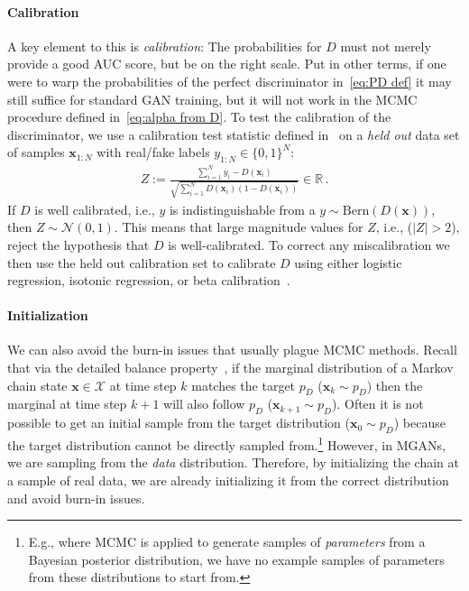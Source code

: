\documentclass{article}
\renewcommand{\vec}[1]{{\boldsymbol{\mathbf{#1}}}} %
\newcommand{\R}{\mathbb{R}}
\newcommand{\set}[1]{\mathcal{#1}}
\newcommand{\sample}{\sim}
\newcommand{\norm}{\mathcal{N}}
\newcommand{\bern}{\textrm{Bern}}
\newcommand{\PD}{{p_D}}
\newcommand{\setx}{\set{X}}
\begin{document}
\paragraph{Calibration}
A key element to this is \emph{calibration}: The probabilities for $D$ must not merely provide a good AUC score, but be on the right scale.
Put in other terms, if one were to warp the probabilities of the perfect discriminator in~\eqref{eq:PD def} it may still suffice for standard GAN training, but it will not work in the MCMC procedure defined in~\eqref{eq:alpha from D}.
To test the calibration of the discriminator, we use a calibration test statistic defined in~\citet{Dawid1997} on a \emph{held out} data set of samples $\vec x_{1:N}$ with real/fake labels $y_{1:N} \in \{0,1\}^N$:
\begin{align}
  Z := \frac{\sum_{i=1}^N y_i - D(\vec x_i)}{\sqrt{\sum_{i=1}^N D(\vec x_i) (1 - D(\vec x_i))}} \in \R\,. \label{eq:calib score}
\end{align}
If $D$ is well calibrated, i.e., $y$ is indistinguishable from a $y \sample \bern(D(\vec x))$, then $Z \sample \norm(0,1)$.
This means that large magnitude values for $Z$, i.e., ($|Z| > 2$), reject the hypothesis that $D$ is well-calibrated.
To correct any miscalibration we then use the held out calibration set to calibrate $D$ using either logistic regression, isotonic regression, or beta calibration~\citep{Kull2017}.

\paragraph{Initialization}
We can also avoid the burn-in issues that usually plague MCMC methods.
Recall that via the detailed balance property~\citep[Ch.~1]{Gilks1996}, if the marginal distribution of a Markov chain state $\vec x \in \setx$ at time step $k$ matches the target $\PD$ ($\vec x_k \sample \PD$) then the marginal at time step $k+1$ will also follow $\PD$ ($\vec x_{k+1} \sample \PD$)\@.
Often it is not possible to get an initial sample from the target distribution ($\vec x_0 \sample \PD$) because
the target distribution cannot be directly sampled from.\footnote{E.g., where MCMC is applied to generate samples of \emph{parameters} from a Bayesian posterior distribution, we have no example samples of parameters from these distributions to start from.}
However, in MGANs, we are sampling from the \emph{data} distribution.
Therefore, by initializing the chain at a sample of real data, we are already initializing it from the correct distribution and avoid burn-in issues.
\end{document}
